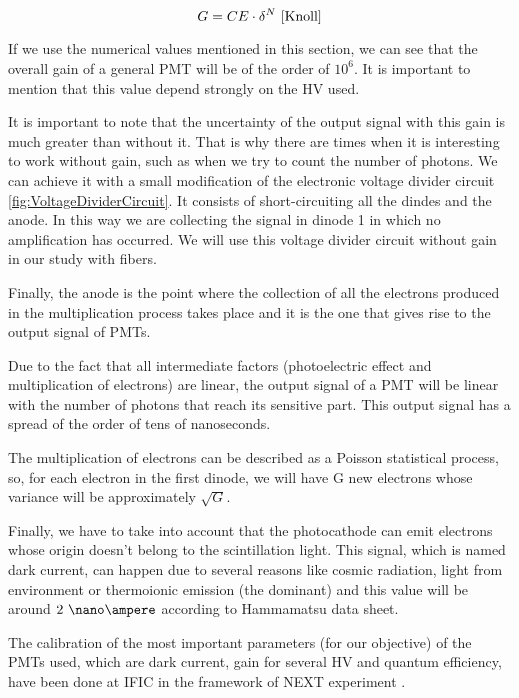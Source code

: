 \begin{itemize}
\begin{equation}
G = CE\cdot{} \delta^N~\cite{Knoll}
\label{eq:PMTGain}
\end{equation}


If we use the numerical values mentioned in this section, we can see that the overall gain of a general PMT will be of the order of $10^6$. It is important to mention that this value depend strongly on the HV used.

It is important to note that the uncertainty of the output signal with this gain is much greater than without it. That is why there are times when it is interesting to work without gain, such as when we try to count the number of photons. We can achieve it with a small modification of the electronic voltage divider circuit \ref{fig:VoltageDividerCircuit}. It consists of short-circuiting all the dindes and the anode. In this way we are collecting the signal in dinode 1 in which no amplification has occurred. We will use this voltage divider circuit without gain in our study with fibers.

Finally, the anode is the point where the collection of all the electrons produced in the multiplication process takes place and it is the one that gives rise to the output signal of PMTs. 

\end{itemize}

Due to the fact that all intermediate factors (photoelectric effect and multiplication of electrons) are linear, the output signal of a PMT will be linear with the number of photons that reach its sensitive part. This output signal has a spread of the order of tens of nanoseconds.

The multiplication of electrons can be described as a Poisson statistical process, so, for each electron in the first dinode, we will have G new electrons whose variance will be approximately $\sqrt{G}$.

Finally, we have to take into account that the photocathode can emit electrons whose origin doesn't belong to the scintillation light. This signal, which is named dark current, can  happen due to several reasons like cosmic radiation, light from environment or thermoionic emission (the dominant) and this value will be around $2~\nano\ampere$ according to Hammamatsu data sheet.

The calibration of the most important parameters (for our objective) of the PMTs used, which are dark current, gain for several HV and quantum efficiency,  have been done at IFIC in the framework of NEXT experiment \cite{CalibrationPMTsNEXT}. 